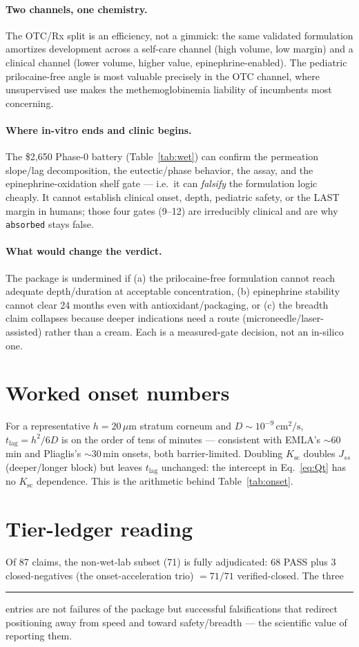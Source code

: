 \documentclass[11pt,a4paper]{article}
\newcommand{\tierdisc}[1]{\textcolor{#1}{\rule[0.05ex]{1.0ex}{1.0ex}}}
\newcommand{\tierRed}{\tierdisc{red!80!black}}
\begin{document}
\paragraph{Two channels, one chemistry.}
The OTC/Rx split is an efficiency, not a gimmick: the same validated formulation
amortizes development across a self-care channel (high volume, low margin) and a
clinical channel (lower volume, higher value, epinephrine-enabled). The pediatric
prilocaine-free angle is most valuable precisely in the OTC channel, where
unsupervised use makes the methemoglobinemia liability of incumbents most
concerning.

\paragraph{Where in-vitro ends and clinic begins.}
The \$2{,}650 Phase-0 battery (Table~\ref{tab:wet}) can confirm the permeation
slope/lag decomposition, the eutectic/phase behavior, the assay, and the
epinephrine-oxidation shelf gate --- i.e.\ it can \emph{falsify} the formulation
logic cheaply. It cannot establish clinical onset, depth, pediatric safety, or
the LAST margin in humans; those four gates (9--12) are irreducibly clinical and
are why \texttt{absorbed} stays false.

\paragraph{What would change the verdict.}
The package is undermined if (a) the prilocaine-free formulation cannot reach
adequate depth/duration at acceptable concentration, (b) epinephrine stability
cannot clear 24 months even with antioxidant/packaging, or (c) the breadth claim
collapses because deeper indications need a route (microneedle/laser-assisted)
rather than a cream. Each is a measured-gate decision, not an in-silico one.

\appendix
\section{Worked onset numbers}
\label{app:onset}
For a representative $h=20\,\mu\text{m}$ stratum corneum and
$D\sim10^{-9}\,\text{cm}^2/\text{s}$, $t_{\mathrm{lag}}=h^2/6D$ is on the order
of tens of minutes --- consistent with EMLA's $\sim60$\,min and Pliaglis's
$\sim30$\,min onsets, both barrier-limited. Doubling $K_{\mathrm{sc}}$ doubles
$J_{ss}$ (deeper/longer block) but leaves $t_{\mathrm{lag}}$ unchanged: the
intercept in Eq.~\eqref{eq:Qt} has no $K_{\mathrm{sc}}$ dependence. This is the
arithmetic behind Table~\ref{tab:onset}.

\section{Tier-ledger reading}
\label{app:ledger}
Of 87 claims, the non-wet-lab subset (71) is fully adjudicated: 68 PASS plus 3
closed-negatives (the onset-acceleration trio) $=71/71$ verified-closed. The
three \tierRed{} entries are not failures of the package but successful
falsifications that redirect positioning away from speed and toward
safety/breadth --- the scientific value of reporting them.



\end{document}
